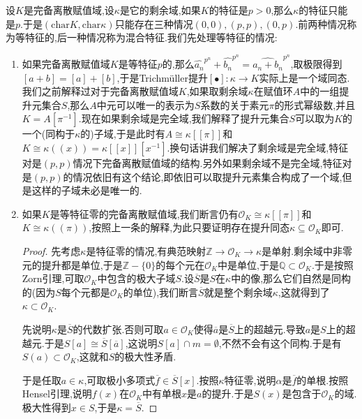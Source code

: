 设$K$是完备离散赋值域,设$\kappa$是它的剩余域,如果$K$的特征是$p>0$,那么$\kappa$的特征只能是$p$.于是$(\mathrm{char}K,\mathrm{char}\kappa)$只能存在三种情况$(0,0),(p,p),(0,p)$.前两种情况称为等特征的,后一种情况称为混合特征.我们先处理等特征的情况:
\begin{enumerate}
	\item 如果完备离散赋值域$K$是等特征$p$的,那么$\widehat{a_n}^{p^n}+\widehat{b_n}^{p^n}=\widehat{a_n+b_n}^{p^n}$,取极限得到$[a+b]=[a]+[b]$,于是Trichm\"uller提升$[\bullet]:\kappa\to K$实际上是一个域同态.我们之前解释过对于完备离散赋值域$K$,如果取剩余域$\kappa$在赋值环$A$中的一组提升元集合$S$,那么$A$中元可以唯一的表示为$S$系数的关于素元$\pi$的形式幂级数,并且$K=A[\pi^{-1}]$.现在如果剩余域是完全域,我们解释了提升元集合$S$可以取为$K$的一个(同构于$\kappa$的)子域,于是此时有$A\cong\kappa[[\pi]]$和$K\cong\kappa((x))=\kappa[[x]][x^{-1}]$.换句话讲我们解决了剩余域是完全域,特征对是$(p,p)$情况下完备离散赋值域的结构.另外如果剩余域不是完全域,特征对是$(p,p)$的情况依旧有这个结论,即依旧可以取提升元素集合构成了一个域,但是这样的子域未必是唯一的.
	\item 如果$K$是等特征零的完备离散赋值域,我们断言仍有$\mathscr{O}_K\cong\kappa[[\pi]]$和$K\cong\kappa((\pi))$,按照上一条的解释,为此只要证明存在提升同态$\kappa\subseteq\mathscr{O}_K$即可.
	\begin{proof}
		
		先考虑$\kappa$是特征零的情况,有典范映射$\mathbb{Z}\to\mathscr{O}_K\to\kappa$是单射.剩余域中非零元的提升都是单位,于是$\mathbb{Z}-\{0\}$的每个元在$\mathscr{O}_K$中是单位,于是$\mathbb{Q}\subset\mathscr{O}_K$.于是按照Zorn引理,可取$\mathscr{O}_K$中包含的极大子域$S$.设$\overline{S}$是$S$在$\kappa$中的像,那么它们自然是同构的(因为$S$每个元都是$\mathscr{O}_K$的单位),我们断言$\overline{S}$就是整个剩余域$\kappa$,这就得到了$\kappa\subset\mathscr{O}_K$.
		
		\qquad
		
		先说明$\kappa$是$\overline{S}$的代数扩张.否则可取$a\in\mathscr{O}_K$使得$\overline{a}$是$\overline{S}$上的超越元.导致$a$是$S$上的超越元.于是$S[a]\cong\overline{S}[\overline{a}]$,这说明$S[a]\cap m=\emptyset$,不然不会有这个同构.于是有$S(a)\subset\mathscr{O}_K$,这就和$S$的极大性矛盾.
		
		\qquad
		
		于是任取$a\in\kappa$,可取极小多项式$\overline{f}\in\overline{S}[x]$.按照$\kappa$特征零,说明$\alpha$是$\overline{f}$的单根.按照Hensel引理,说明$f(x)$在$\mathscr{O}_K$中有单根$x$是$a$的提升.于是$S(x)$是包含于$\mathscr{O}_K$的域.极大性得到$x\in S$,于是$\kappa=\overline{S}$.
	\end{proof}
\end{enumerate}

